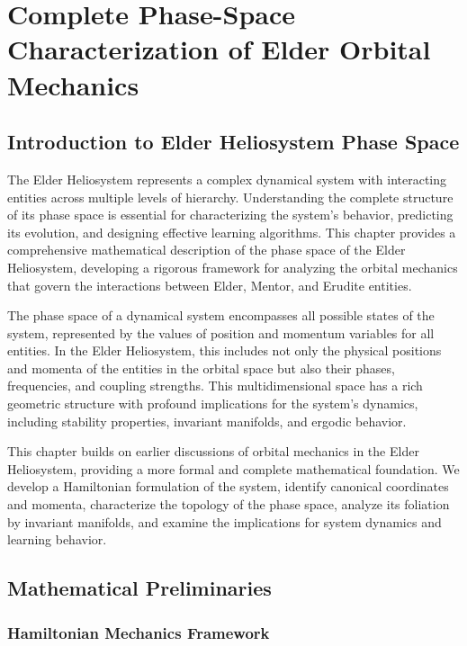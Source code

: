 \chapter{Complete Phase-Space Characterization of Elder Orbital Mechanics}

\section{Introduction to Elder Heliosystem Phase Space}

The Elder Heliosystem represents a complex dynamical system with interacting entities across multiple levels of hierarchy. Understanding the complete structure of its phase space is essential for characterizing the system's behavior, predicting its evolution, and designing effective learning algorithms. This chapter provides a comprehensive mathematical description of the phase space of the Elder Heliosystem, developing a rigorous framework for analyzing the orbital mechanics that govern the interactions between Elder, Mentor, and Erudite entities.

The phase space of a dynamical system encompasses all possible states of the system, represented by the values of position and momentum variables for all entities. In the Elder Heliosystem, this includes not only the physical positions and momenta of the entities in the orbital space but also their phases, frequencies, and coupling strengths. This multidimensional space has a rich geometric structure with profound implications for the system's dynamics, including stability properties, invariant manifolds, and ergodic behavior.

This chapter builds on earlier discussions of orbital mechanics in the Elder Heliosystem, providing a more formal and complete mathematical foundation. We develop a Hamiltonian formulation of the system, identify canonical coordinates and momenta, characterize the topology of the phase space, analyze its foliation by invariant manifolds, and examine the implications for system dynamics and learning behavior.

\section{Mathematical Preliminaries}

\subsection{Hamiltonian Mechanics Framework}

